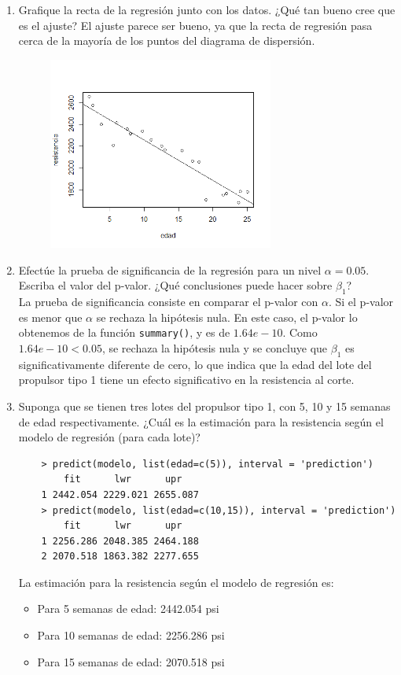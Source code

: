 \documentclass[12pt,a4paper]{article}
\begin{document}
\begin{enumerate}
  \item Grafique la recta de la regresi\'on junto con los datos. ¿Qu\'e tan bueno cree que es el ajuste? El ajuste parece ser bueno, ya que la recta de regresi\'on pasa cerca de la mayor\'ia de los puntos del diagrama de dispersi\'on.
  \begin{figure}[H]
    \centering
    \includegraphics[width=0.7\textwidth]{img/RectaRegresion.png}
  \end{figure}

  \item Efect\'ue la prueba de significancia de la regresi\'on para un nivel $\alpha=0.05$. Escriba el valor del p-valor. ¿Qu\'e conclusiones puede hacer sobre $\beta_1$?
  \\ 
  La prueba de significancia consiste en comparar el p-valor con $\alpha$. Si el p-valor es menor que $\alpha$ se rechaza la hip\'otesis nula. En este caso, el p-valor lo obtenemos de la funci\'on \texttt{summary()}, y es de $1.64e-10$. Como $1.64e-10 < 0.05$, se rechaza la hip\'otesis nula y se concluye que $\beta_1$ es significativamente diferente de cero, lo que indica que la edad del lote del propulsor tipo 1 tiene un efecto significativo en la resistencia al corte.
  \newpage

  \item Suponga que se tienen tres lotes del propulsor tipo 1, con 5, 10 y 15 semanas de edad respectivamente. ¿Cu\'al es la estimaci\'on para la resistencia seg\'un el modelo de regresi\'on (para cada lote)?
  \begin{lstlisting}
    > predict(modelo, list(edad=c(5)), interval = 'prediction')
        fit      lwr      upr
    1 2442.054 2229.021 2655.087
    > predict(modelo, list(edad=c(10,15)), interval = 'prediction')
        fit      lwr      upr
    1 2256.286 2048.385 2464.188
    2 2070.518 1863.382 2277.655
  \end{lstlisting}
  La estimaci\'on para la resistencia seg\'un el modelo de regresi\'on es:
  \begin{itemize}
    \item Para 5 semanas de edad: 2442.054 psi
    \item Para 10 semanas de edad: 2256.286 psi
    \item Para 15 semanas de edad: 2070.518 psi
  \end{itemize}


\end{enumerate}
\end{document}
